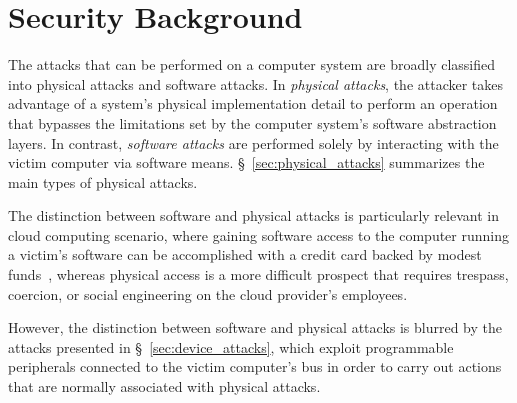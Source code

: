 \section{Security Background}
\label{sec:security_background}

The attacks that can be performed on a computer system are broadly classified
into physical attacks and software attacks. In \textit{physical attacks}, the
attacker takes advantage of a system's physical implementation detail to
perform an operation that bypasses the limitations set by the computer
system's software abstraction layers. In contrast, \textit{software attacks}
are performed solely by interacting with the victim computer via software
means. \S~\ref{sec:physical_attacks} summarizes the main types of physical
attacks.

The distinction between software and physical attacks is particularly relevant
in cloud computing scenario, where gaining software access to the computer
running a victim's software can be accomplished with a credit card backed by
modest funds~\cite{ristenpart2009colocation}, whereas physical access is a
more difficult prospect that requires trespass, coercion, or social engineering
on the cloud provider's employees.

However, the distinction between software and physical attacks is blurred by
the attacks presented in \S~\ref{sec:device_attacks}, which exploit
programmable peripherals connected to the victim computer's bus in order to
carry out actions that are normally associated with physical attacks.





%


